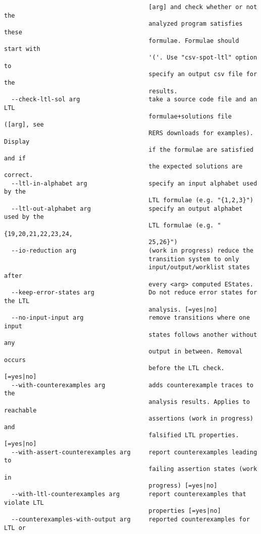 \documentclass[natbib]{article}
\begin{document}
\begin{verbatim}
                                        [arg] and check whether or not the 
                                        analyzed program satisfies these 
                                        formulae. Formulae should start with 
                                        '('. Use "csv-spot-ltl" option to 
                                        specify an output csv file for the 
                                        results.
  --check-ltl-sol arg                   take a source code file and an LTL 
                                        formulae+solutions file ([arg], see 
                                        RERS downloads for examples). Display 
                                        if the formulae are satisfied and if 
                                        the expected solutions are correct.
  --ltl-in-alphabet arg                 specify an input alphabet used by the 
                                        LTL formulae (e.g. "{1,2,3}")
  --ltl-out-alphabet arg                specify an output alphabet used by the 
                                        LTL formulae (e.g. "{19,20,21,22,23,24,
                                        25,26}")
  --io-reduction arg                    (work in progress) reduce the 
                                        transition system to only 
                                        input/output/worklist states after 
                                        every <arg> computed EStates.
  --keep-error-states arg               Do not reduce error states for the LTL 
                                        analysis. [=yes|no]
  --no-input-input arg                  remove transitions where one input 
                                        states follows another without any 
                                        output in between. Removal occurs 
                                        before the LTL check. [=yes|no]
  --with-counterexamples arg            adds counterexample traces to the 
                                        analysis results. Applies to reachable 
                                        assertions (work in progress) and 
                                        falsified LTL properties. [=yes|no]
  --with-assert-counterexamples arg     report counterexamples leading to 
                                        failing assertion states (work in 
                                        progress) [=yes|no]
  --with-ltl-counterexamples arg        report counterexamples that violate LTL
                                        properties [=yes|no]
  --counterexamples-with-output arg     reported counterexamples for LTL or 

\end{verbatim}
\end{document}
